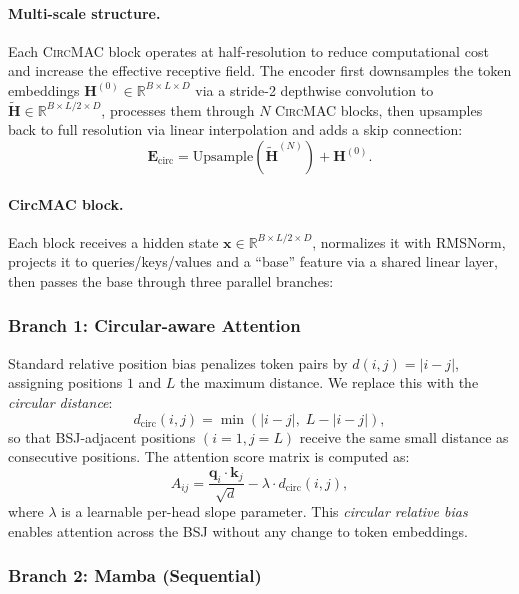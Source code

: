 \documentclass[10pt,twocolumn]{article}
\newcommand{\circmac}{\textsc{CircMAC}}
\newcommand{\dcirc}{d_{\text{circ}}}
\begin{document}
\paragraph{Multi-scale structure.}
Each \circmac{} block operates at half-resolution to reduce computational
cost and increase the effective receptive field.
The encoder first downsamples the token embeddings
$\mathbf{H}^{(0)} \in \mathbb{R}^{B \times L \times D}$
via a stride-2 depthwise convolution to
$\tilde{\mathbf{H}} \in \mathbb{R}^{B \times L/2 \times D}$,
processes them through $N$ \circmac{} blocks, then upsamples back to
full resolution via linear interpolation and adds a skip connection:
\begin{equation}
  \mathbf{E}_{\text{circ}} = \text{Upsample}\!\left(\tilde{\mathbf{H}}^{(N)}\right)
    + \mathbf{H}^{(0)}.
\end{equation}

\paragraph{CircMAC block.}
Each block receives a hidden state $\mathbf{x} \in \mathbb{R}^{B \times L/2 \times D}$,
normalizes it with RMSNorm, projects it to queries/keys/values and a
``base'' feature via a shared linear layer, then passes the base
through three parallel branches:

\subsubsection{Branch 1: Circular-aware Attention}

Standard relative position bias penalizes token pairs by
$d(i,j) = |i-j|$, assigning positions $1$ and $L$ the maximum distance.
We replace this with the \emph{circular distance}:
\begin{equation}
  \dcirc(i,j) = \min\!\left(|i-j|,\; L - |i-j|\right),
  \label{eq:circ_bias}
\end{equation}
so that BSJ-adjacent positions $(i{=}1, j{=}L)$ receive the same small
distance as consecutive positions.
The attention score matrix is computed as:
\begin{equation}
  A_{ij} = \frac{\mathbf{q}_i \cdot \mathbf{k}_j}{\sqrt{d}} - \lambda \cdot \dcirc(i,j),
\end{equation}
where $\lambda$ is a learnable per-head slope parameter.
This \emph{circular relative bias} enables attention across the BSJ
without any change to token embeddings.

\subsubsection{Branch 2: Mamba (Sequential)}
\end{document}

